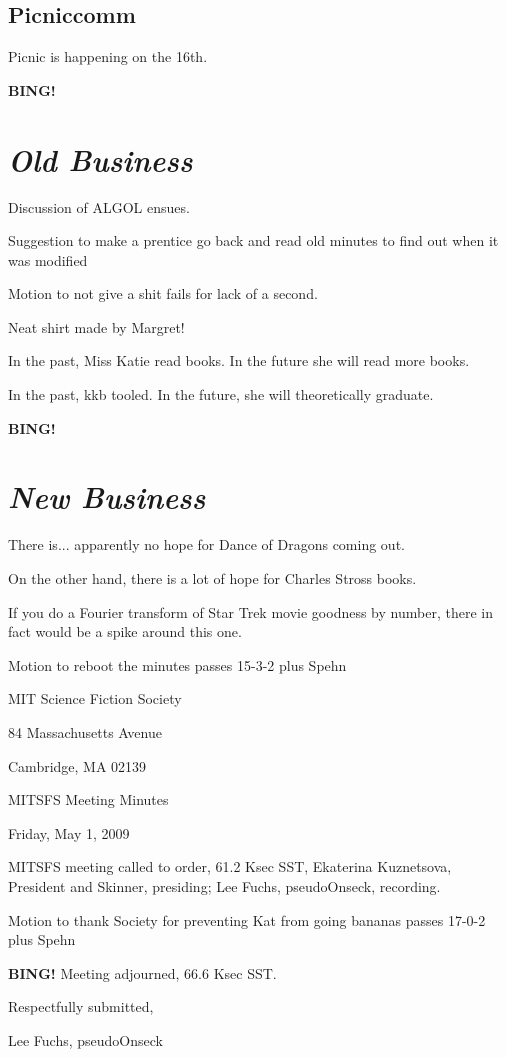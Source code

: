 \documentclass[10pt]{article}
\newcommand{\bing}{{\bf BING!} }
\newcommand{\goto}[1]{\bing \vskip 12pt \section*{{\em{#1}}}}
\newcommand{\ps}{ plus Spehn\xspace}
\begin{document}
\subsection*{Picniccomm}
Picnic is happening on the 16th.


\goto{Old Business}
Discussion of ALGOL ensues.

Suggestion to make a prentice go back and read old minutes to find out when it was modified

Motion to not give a shit fails for lack of a second.

Neat shirt made by Margret!

In the past, Miss Katie read books. In the future she will read more books.

In the past, kkb tooled. In the future, she will theoretically graduate.

\goto{New Business}

There is... apparently no hope for Dance of Dragons coming out.

On the other hand, there is a lot of hope for Charles Stross books.

If you do a Fourier transform of Star Trek movie goodness by number, there in fact would be
a spike around this one.

Motion to reboot the minutes passes 15-3-2 \ps

\begin{center}

MIT Science Fiction Society

84 Massachusetts Avenue

Cambridge, MA 02139

\vspace{12pt}

MITSFS Meeting Minutes

Friday, May 1, 2009

\end{center}

\vspace{18pt}

\setlength{\parskip}{6pt}

\noindent
MITSFS meeting called to order, 61.2 Ksec SST,
Ekaterina Kuznetsova, President and Skinner, presiding; Lee Fuchs, pseudoOnseck, recording.

Motion to thank Society for preventing Kat from going bananas passes 17-0-2 \ps 

\bing
\noindent
Meeting adjourned, 66.6 Ksec SST.

\vspace{18pt}

\centerline{Respectfully submitted,}
\centerline{Lee Fuchs, pseudoOnseck}
\end{document}
